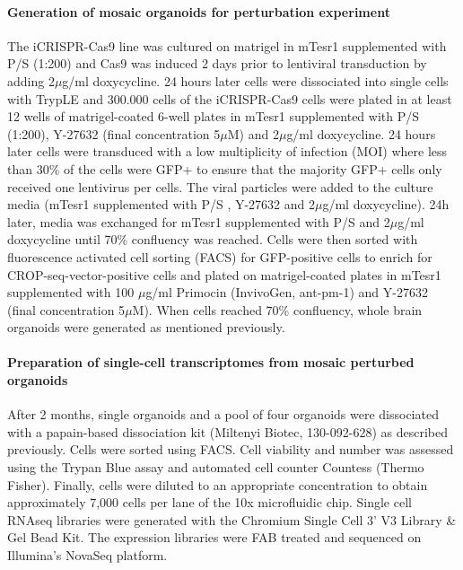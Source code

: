 \paragraph{Generation of mosaic organoids for perturbation experiment}
The iCRISPR-Cas9 line was cultured on matrigel in mTesr1 supplemented with P/S (1:200) and Cas9 was induced 2 days prior to lentiviral transduction by adding 2$\mu$g/ml doxycycline. 24 hours later cells were dissociated into single cells with TrypLE and 300.000 cells of the iCRISPR-Cas9 cells were plated in at least 12 wells of  matrigel-coated 6-well plates in mTesr1 supplemented with P/S (1:200), Y-27632 (final concentration 5$\mu$M) and 2$\mu$g/ml doxycycline. 24 hours later cells were transduced with a low multiplicity of infection (MOI) where less than 30\% of the cells were GFP+ to ensure that the majority GFP+ cells only received one lentivirus per cells. The viral particles were added to the culture media (mTesr1 supplemented with P/S , Y-27632 and 2$\mu$g/ml doxycycline). 24h later, media was exchanged for mTesr1 supplemented with P/S and 2$\mu$g/ml doxycycline until 70\% confluency was reached. Cells were then sorted with fluorescence  activated  cell sorting (FACS) for GFP-positive cells  to enrich for CROP-seq-vector-positive cells and plated on matrigel-coated plates in  mTesr1 supplemented with 100 $\mu$g/ml Primocin (InvivoGen, ant-pm-1) and Y-27632 (final concentration 5$\mu$M). When cells reached 70\% confluency, whole brain organoids were generated as mentioned previously.
 
\paragraph{Preparation of single-cell transcriptomes from mosaic perturbed organoids}
After 2 months, single organoids and a pool of four organoids were dissociated with a papain-based dissociation kit (Miltenyi Biotec, 130-092-628) as described previously. Cells were sorted using FACS. Cell viability and number was assessed using the Trypan Blue assay and automated cell counter Countess (Thermo Fisher). Finally, cells were diluted to an appropriate concentration to obtain approximately 7,000 cells per lane of the 10x microfluidic chip.  Single cell RNAseq libraries were generated with the Chromium Single Cell 3' V3 Library \& Gel Bead Kit. The expression libraries were FAB treated and sequenced on Illumina's NovaSeq platform.
 
